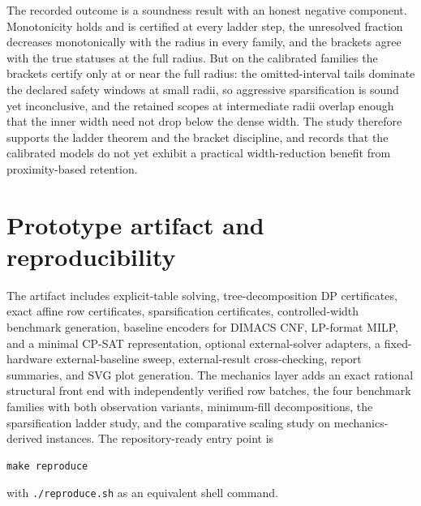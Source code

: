 \documentclass[11pt]{article}
\theoremstyle{plain}
\theoremstyle{definition}
\theoremstyle{remark}
\begin{document}
The recorded outcome is a soundness result with an honest negative
component.  Monotonicity holds and is certified at every ladder step, the
unresolved fraction decreases monotonically with the radius in every family,
and the brackets agree with the true statuses at the full radius.  But on
the calibrated families the brackets certify only at or near the full
radius: the omitted-interval tails dominate the declared safety windows at
small radii, so aggressive sparsification is sound yet inconclusive, and the
retained scopes at intermediate radii overlap enough that the inner width
need not drop below the dense width.  The study therefore supports the
ladder theorem and the bracket discipline, and records that the calibrated
models do not yet exhibit a practical width-reduction benefit from
proximity-based retention.

\section{Prototype artifact and reproducibility}
\label{sec:artifact}

The artifact includes explicit-table solving, tree-decomposition DP
certificates, exact affine row certificates, sparsification certificates,
controlled-width benchmark generation, baseline encoders for DIMACS CNF,
LP-format MILP, and a minimal CP-SAT representation, optional
external-solver adapters, a fixed-hardware external-baseline sweep,
external-result cross-checking, report summaries, and SVG plot generation.
The mechanics layer adds an exact rational structural front end with
independently verified row batches, the four benchmark families with both
observation variants, minimum-fill decompositions, the sparsification ladder
study, and the comparative scaling study on mechanics-derived instances.
The repository-ready entry point is
\begin{verbatim}
make reproduce
\end{verbatim}
with \texttt{./reproduce.sh} as an equivalent shell command.
\end{document}

